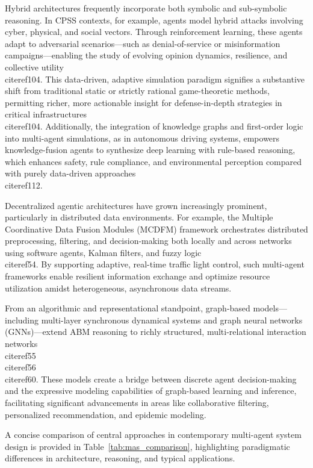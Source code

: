 \documentclass[11pt]{article}
\begin{document}
Hybrid architectures frequently incorporate both symbolic and sub-symbolic reasoning. In CPSS contexts, for example, agents model hybrid attacks involving cyber, physical, and social vectors. Through reinforcement learning, these agents adapt to adversarial scenarios—such as denial-of-service or misinformation campaigns—enabling the study of evolving opinion dynamics, resilience, and collective utility~\\cite{ref104}. This data-driven, adaptive simulation paradigm signifies a substantive shift from traditional static or strictly rational game-theoretic methods, permitting richer, more actionable insight for defense-in-depth strategies in critical infrastructures~\\cite{ref104}. Additionally, the integration of knowledge graphs and first-order logic into multi-agent simulations, as in autonomous driving systems, empowers knowledge-fusion agents to synthesize deep learning with rule-based reasoning, which enhances safety, rule compliance, and environmental perception compared with purely data-driven approaches~\\cite{ref112}.

Decentralized agentic architectures have grown increasingly prominent, particularly in distributed data environments. For example, the Multiple Coordinative Data Fusion Modules (MCDFM) framework orchestrates distributed preprocessing, filtering, and decision-making both locally and across networks using software agents, Kalman filters, and fuzzy logic~\\cite{ref54}. By supporting adaptive, real-time traffic light control, such multi-agent frameworks enable resilient information exchange and optimize resource utilization amidst heterogeneous, asynchronous data streams.

From an algorithmic and representational standpoint, graph-based models—including multi-layer synchronous dynamical systems and graph neural networks (GNNs)—extend ABM reasoning to richly structured, multi-relational interaction networks~\\cite{ref55}\\cite{ref56}\\cite{ref60}. These models create a bridge between discrete agent decision-making and the expressive modeling capabilities of graph-based learning and inference, facilitating significant advancements in areas like collaborative filtering, personalized recommendation, and epidemic modeling.

A concise comparison of central approaches in contemporary multi-agent system design is provided in Table~\ref{tab:mas_comparison}, highlighting paradigmatic differences in architecture, reasoning, and typical applications.
\end{document}
